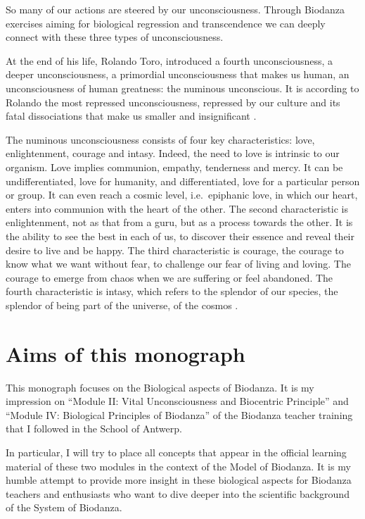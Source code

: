 \documentclass[
  11pt,
]{book}
\begin{document}
So many of our actions are steered by our unconsciousness.
Through Biodanza exercises aiming for biological regression and transcendence we can deeply connect with these three types of unconsciousness.

At the end of his life, Rolando Toro, introduced a fourth unconsciousness, a deeper unconsciousness, a primordial unconsciousness that makes us human, an unconsciousness of human greatness: the numinous unconscious. It is according to Rolando the most repressed unconsciousness, repressed by our culture and its fatal dissociations that make us smaller and insignificant \citep{toro2009}.

The numinous unconsciousness consists of four key characteristics: love, enlightenment, courage and intasy. Indeed, the need to love is intrinsic to our organism. Love implies communion, empathy, tenderness and mercy. It can be undifferentiated, love for humanity, and differentiated, love for a particular person or group. It can even reach a cosmic level, i.e.~epiphanic love, in which our heart, enters into communion with the heart of the other. The second characteristic is enlightenment, not as that from a guru, but as a process towards the other. It is the ability to see the best in each of us, to discover their essence and reveal their desire to live and be happy. The third characteristic is courage, the courage to know what we want without fear, to challenge our fear of living and loving. The courage to emerge from chaos when we are suffering or feel abandoned. The fourth characteristic is intasy, which refers to the splendor of our species, the splendor of being part of the universe, of the cosmos \citep{toro2009}.
\newpage 

\hypertarget{aims-of-this-monograph}{%
\section{Aims of this monograph}\label{aims-of-this-monograph}}

This monograph focuses on the Biological aspects of Biodanza. It is my impression on ``Module II: Vital Unconsciousness and Biocentric Principle'' and ``Module IV: Biological Principles of Biodanza'' of the Biodanza teacher training that I followed in the School of Antwerp.

In particular, I will try to place all concepts that appear in the official learning material of these two modules in the context of the Model of Biodanza. It is my humble attempt to provide more insight in these biological aspects for Biodanza teachers and enthusiasts who want to dive deeper into the scientific background of the System of Biodanza.
\end{document}

